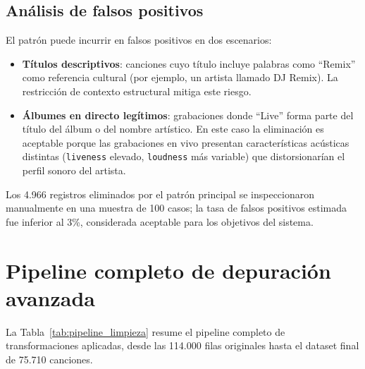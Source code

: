 \documentclass[12pt, a4paper]{book}
\theoremstyle{definition}
\begin{document}
\subsection{Análisis de falsos positivos}

El patrón puede incurrir en falsos positivos en dos escenarios:
\begin{itemize}
  \item \textbf{Títulos descriptivos}: canciones cuyo título incluye palabras
        como ``Remix'' como referencia cultural (por ejemplo, un artista
        llamado DJ Remix). La restricción de contexto estructural mitiga
        este riesgo.
  \item \textbf{Álbumes en directo legítimos}: grabaciones donde ``Live''
        forma parte del título del álbum o del nombre artístico. En este
        caso la eliminación es aceptable porque las grabaciones en vivo
        presentan características acústicas distintas (\texttt{liveness}
        elevado, \texttt{loudness} más variable) que distorsionarían el
        perfil sonoro del artista.
\end{itemize}

Los 4.966 registros eliminados por el patrón principal se inspeccionaron
manualmente en una muestra de 100 casos; la tasa de falsos positivos
estimada fue inferior al 3\%, considerada aceptable para los objetivos
del sistema.

\section{Pipeline completo de depuración avanzada}
\label{sec:pipeline_limpieza}

La Tabla~\ref{tab:pipeline_limpieza} resume el pipeline completo de
transformaciones aplicadas, desde las 114.000 filas originales hasta el
dataset final de 75.710 canciones.
\end{document}
